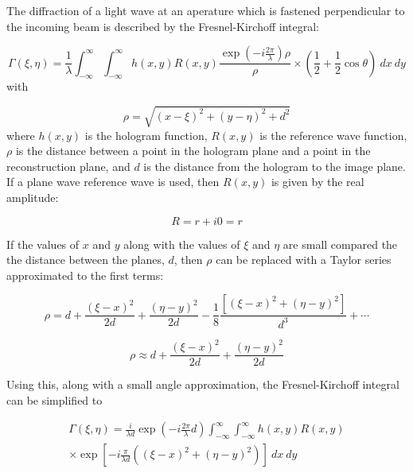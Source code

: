 The diffraction of a light wave at an aperature which is fastened perpendicular
to the incoming beam is described by the Fresnel-Kirchoff integral:

\begin{equation}
    \Gamma(\xi,\eta) =
    \frac{1}{\lambda}\int_{-\infty}^{\infty}\int_{-\infty}^{\infty}h(x,y)R(x,y)\frac{\exp\left(
        -i\frac{2\pi}{\lambda} \right)\rho}{\rho}\times \left(
        \frac{1}{2}+\frac{1}{2}\cos\theta \right)~dx~dy
        \label{fresnel-kirchoff}
    \end{equation}
    with

    \begin{equation}
        \rho = \sqrt{(x-\xi)^{2}+(y-\eta)^{2}+d^{2}}
    \end{equation}
    where $h(x,y)$ is the hologram function, $R(x,y)$ is the reference wave
    function, $\rho$ is the distance between a point in the hologram plane and
    a point in the reconstruction plane, and $d$ is the distance from the hologram
    to the image plane. If a plane wave reference wave is used,
    then $R(x,y)$ is given by the real amplitude:

    \begin{equation}
        R = r+ i0 = r
    \end{equation}

    If the values of $x$ and $y$ along with the values of $\xi$ and $\eta$ are
    small compared the the distance between the planes, $d$, then $\rho$ can be
    replaced with a Taylor series approximated to the first terms:

    \begin{equation}
        \rho=d+\frac{(\xi-x)^{2}}{2d}+\frac{(\eta-y)^{2}}{2d}-\frac{1}{8}\frac{\left[
        (\xi-x)^{2}+(\eta-y)^{2} \right]}{d^{3}} + \cdots
    \end{equation}

    \begin{equation}
        \rho\approx d+\frac{(\xi-x)^{2}}{2d}+\frac{(\eta-y)^{2}}{2d}
    \end{equation}

    Using this, along with a small angle approximation, the Fresnel-Kirchoff
    integral can be simplified to

    \begin{multline}
        \Gamma(\xi,\eta) = \frac{i}{\lambda d} \exp\left( -i\frac{2\pi}{\lambda}d \right)
        \int_{-\infty}^{\infty}\int_{-\infty}^{\infty}h(x,y)R(x,y) \\
        \times \exp\left[ -i\frac{\pi}{\lambda d}\left(
        (\xi-x)^{2}+(\eta-y)^{2} \right) \right]~dx~dy
    \end{multline}

